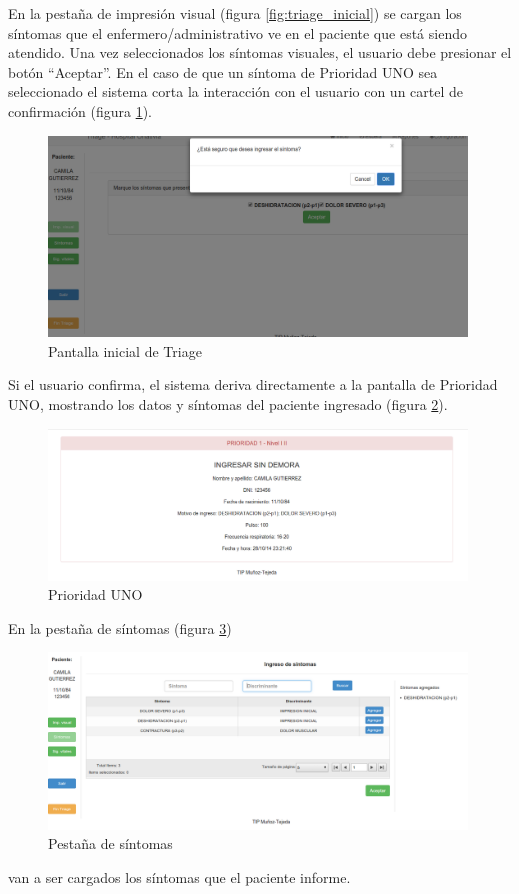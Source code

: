 En la pestaña de impresión visual (figura \ref{fig:triage_inicial}) se cargan los síntomas que el enfermero/administrativo ve en el paciente que está siendo atendido. Una vez seleccionados los síntomas visuales, el usuario debe presionar el botón ``Aceptar''. En el caso de que un síntoma de Prioridad UNO sea seleccionado el sistema corta la interacción con el usuario con un cartel de confirmación (figura \ref{fig:impresion_visual_p1}).
\begin{figure}
\centerline{\includegraphics[width=0.99\textwidth]{impresion_visual_p1.png}}
\caption{Pantalla inicial de Triage} \label{fig:impresion_visual_p1}
\end{figure}
Si el usuario confirma, el sistema deriva directamente a la pantalla de Prioridad UNO, mostrando los datos y síntomas del paciente ingresado (figura \ref{fig:prioridad_uno}).
\begin{figure}
\centerline{\includegraphics[width=0.99\textwidth]{prioridad_uno.png}}
\caption{Prioridad UNO} \label{fig:prioridad_uno}
\end{figure}

En la pestaña de síntomas (figura \ref{fig:sintomas})
\begin{figure}
\centerline{\includegraphics[width=0.99\textwidth]{sintomas.png}}
\caption{Pestaña de síntomas} \label{fig:sintomas}
\end{figure}
van a ser cargados los síntomas que el paciente informe. 


